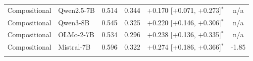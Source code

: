 \begin{table}[t]
\begin{tabular}{llcccc}
\addlinespace
Compositional & Qwen2.5-7B & 0.514 & 0.344 & \textcolor{gain}{+0.170} [+0.071, +0.273]$^{*}$ & n/a \\
Compositional & Qwen3-8B & 0.545 & 0.325 & \textcolor{gain}{+0.220} [+0.146, +0.306]$^{*}$ & n/a \\
Compositional & OLMo-2-7B & 0.534 & 0.296 & \textcolor{gain}{+0.238} [+0.136, +0.335]$^{*}$ & n/a \\
Compositional & Mistral-7B & 0.596 & 0.322 & \textcolor{gain}{+0.274} [+0.186, +0.366]$^{*}$ & -1.85 \\
\addlinespace
\bottomrule
\end{tabular}
\end{table}
